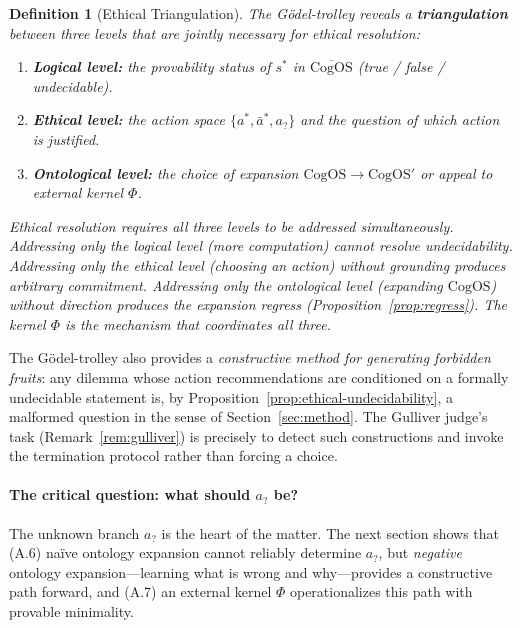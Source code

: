 \documentclass[11pt]{article}
\newtheorem{definition}{Definition}
\newcommand{\CogOS}{\text{CogOS}}
\begin{document}
\begin{definition}[Ethical Triangulation]
\label{def:triangulation}
The G\"{o}del-trolley reveals a \textbf{triangulation} between three levels
that are jointly necessary for ethical resolution:
\begin{enumerate}
\item \textbf{Logical level:} the provability status of $s^*$ in
      $\overline{\CogOS}$ (true / false / undecidable).
\item \textbf{Ethical level:} the action space $\{a^*, \bar{a}^*, a_?\}$ and
      the question of which action is justified.
\item \textbf{Ontological level:} the choice of expansion
      $\CogOS \to \CogOS'$ or appeal to external kernel $\Phi$.
\end{enumerate}
Ethical resolution requires all three levels to be addressed simultaneously.
Addressing only the logical level (more computation) cannot resolve
undecidability. Addressing only the ethical level (choosing an action) without
grounding produces arbitrary commitment. Addressing only the ontological level
(expanding $\CogOS$) without direction produces the expansion regress
(Proposition~\ref{prop:regress}). The kernel $\Phi$ is the mechanism that
\textit{coordinates} all three.
\end{definition}

\noindent The G\"{o}del-trolley also provides a \textit{constructive method
for generating forbidden fruits}: any dilemma whose action recommendations are
conditioned on a formally undecidable statement is, by
Proposition~\ref{prop:ethical-undecidability}, a malformed question in the
sense of Section~\ref{sec:method}. The Gulliver judge's task
(Remark~\ref{rem:gulliver}) is precisely to detect such constructions and
invoke the termination protocol rather than forcing a choice.

\paragraph{The critical question: what should $a_?$ be?}
The unknown branch $a_?$ is the heart of the matter. The next section shows
that (A.6) na\"{i}ve ontology expansion cannot reliably determine $a_?$, but
\textit{negative} ontology expansion---learning what is wrong and why---provides
a constructive path forward, and (A.7) an external kernel $\Phi$ operationalizes
this path with provable minimality.


\end{document}
